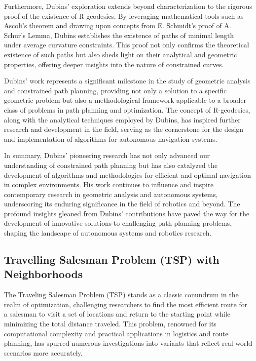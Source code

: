 \vspace*{6mm}


Furthermore, Dubins' exploration extends beyond characterization to the rigorous proof of the existence of R-geodesics. By leveraging mathematical tools such as Ascoli's theorem and drawing upon concepts from E. Schmidt's proof of A. Schur's Lemma, Dubins establishes the existence of paths of minimal length under average curvature constraints. This proof not only confirms the theoretical existence of such paths but also sheds light on their analytical and geometric properties, offering deeper insights into the nature of constrained curves.

\vspace*{6mm}


Dubins' work represents a significant milestone in the study of geometric analysis and constrained path planning, providing not only a solution to a specific geometric problem but also a methodological framework applicable to a broader class of problems in path planning and optimization. The concept of R-geodesics, along with the analytical techniques employed by Dubins, has inspired further research and development in the field, serving as the cornerstone for the design and implementation of algorithms for autonomous navigation systems.

\vspace*{6mm}


In summary, Dubins' pioneering research has not only advanced our understanding of constrained path planning but has also catalyzed the development of algorithms and methodologies for efficient and optimal navigation in complex environments. His work continues to influence and inspire contemporary research in geometric analysis and autonomous systems, underscoring its enduring significance in the field of robotics and beyond. The profound insights gleaned from Dubins' contributions have paved the way for the development of innovative solutions to challenging path planning problems, shaping the landscape of autonomous systems and robotics research.


\subsection{Travelling Salesman Problem (TSP) with Neighborhoods}

The Traveling Salesman Problem (TSP) stands as a classic conundrum in the realm of optimization, challenging researchers to find the most efficient route for a salesman to visit a set of locations and return to the starting point while minimizing the total distance traveled. This problem, renowned for its computational complexity and practical applications in logistics and route planning, has spurred numerous investigations into variants that reflect real-world scenarios more accurately.

